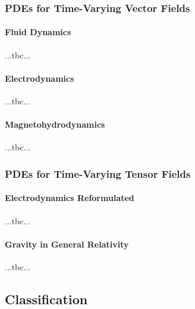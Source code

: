 \subsubsection{PDEs for Time-Varying Vector Fields}

\paragraph{Fluid Dynamics} ...tbc...



\paragraph{Electrodynamics} ...tbc...

\paragraph{Magnetohydrodynamics} ...tbc...




\subsubsection{PDEs for Time-Varying Tensor Fields}

\paragraph{Electrodynamics Reformulated} ...tbc...

\paragraph{Gravity in General Relativity} ...tbc...






\subsection{Classification}


